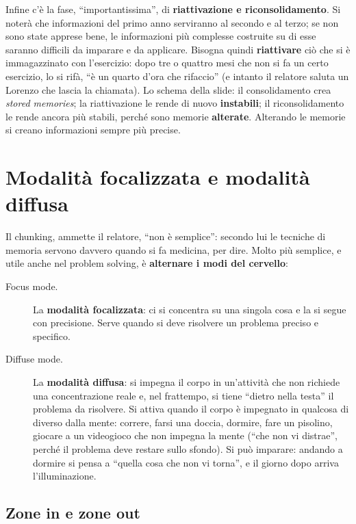 Infine c'è la fase, ``importantissima'', di \textbf{riattivazione e
riconsolidamento}. Si noterà che informazioni del primo anno serviranno al
secondo e al terzo; se non sono state apprese bene, le informazioni più
complesse costruite su di esse saranno difficili da imparare e da
applicare. Bisogna quindi \textbf{riattivare} ciò che si è immagazzinato con
l'esercizio: dopo tre o quattro mesi che non si fa un certo esercizio, lo si
rifà, ``è un quarto d'ora che rifaccio'' (e intanto il relatore saluta un
Lorenzo che lascia la chiamata). Lo schema della slide: il consolidamento
crea \emph{stored memories}; la riattivazione le rende di nuovo
\textbf{instabili}; il riconsolidamento le rende ancora più stabili, perché
sono memorie \textbf{alterate}. Alterando le memorie si creano informazioni
sempre più precise.

\section{Modalità focalizzata e modalità diffusa}
\label{p0:sec:modi}

Il chunking, ammette il relatore, ``non è semplice'': secondo lui le
tecniche di memoria servono davvero quando si fa medicina, per dire. Molto
più semplice, e utile anche nel problem solving, è \textbf{alternare i modi
del cervello}:
\begin{description}
  \item[Focus mode.] La \textbf{modalità focalizzata}: ci si concentra su
        una singola cosa e la si segue con precisione. Serve quando si deve
        risolvere un problema preciso e specifico.
  \item[Diffuse mode.] La \textbf{modalità diffusa}: si impegna il corpo in
        un'attività che non richiede una concentrazione reale e, nel
        frattempo, si tiene ``dietro nella testa'' il problema da
        risolvere. Si attiva quando il corpo è impegnato in qualcosa di
        diverso dalla mente: correre, farsi una doccia, dormire, fare un
        pisolino, giocare a un videogioco che non impegna la mente (``che
        non vi distrae'', perché il problema deve restare sullo sfondo).
        Si può imparare: andando a dormire si pensa a ``quella cosa che non
        vi torna'', e il giorno dopo arriva l'illuminazione.
\end{description}

\subsection{Zone in e zone out}

